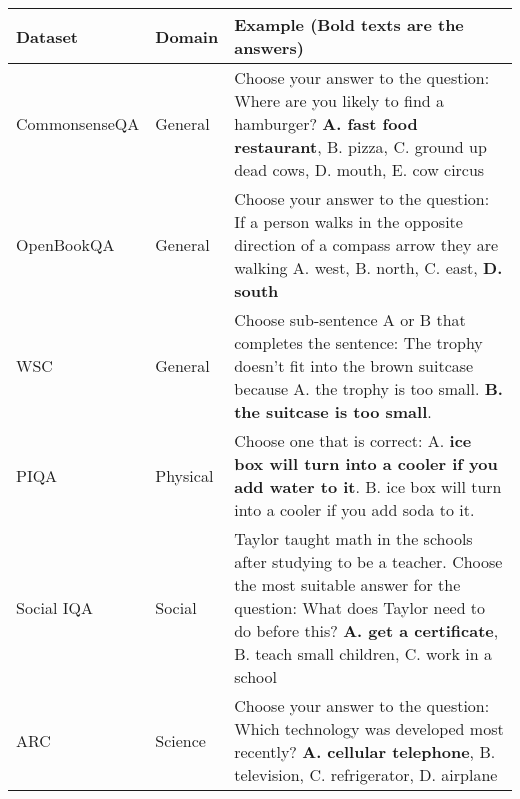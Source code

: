 \begin{table}[h!]
	\small
	\centering
	\begin{tabularx}{\textwidth}{|l|l|X|}
		\hline
		Dataset       & Domain       & Example (Bold texts are the answers)                                                                                                                                                                                                                                     \\
		\hline
		CommonsenseQA & General      & Choose your answer to the question: Where are you likely to find a hamburger? \textbf{A. fast food restaurant}, B. pizza, C. ground up dead cows, D. mouth, E. cow circus                                                                                                \\
		\hline
		OpenBookQA    & General      & Choose your answer to the question: If a person walks in the opposite direction of a compass arrow they are walking A. west, B. north, C. east, \textbf{D. south}                                                                                                        \\
		\hline
		WSC           & General      & Choose sub-sentence A or B that completes the sentence: The trophy doesn't fit into the brown suitcase because A. the trophy is too small. \textbf{B. the suitcase is too small}.                                                                                        \\
		\hline
		PIQA          & Physical     & Choose one that is correct: A. \textbf{ice box will turn into a cooler if you add water to it}. B. ice box will turn into a cooler if you add soda to it.                                                                                                                \\
		\hline
		Social IQA    & Social       & Taylor taught math in the schools after studying to be a teacher. Choose the most suitable answer for the question: What does Taylor need to do before this? \textbf{A. get a certificate}, B. teach small children, C. work in a school                                 \\
		\hline
		ARC           & Science      & Choose your answer to the question: Which technology was developed most recently? \textbf{A. cellular telephone}, B. television, C. refrigerator, D. airplane                                                                                                            \\

\end{tabularx}
\end{table}
